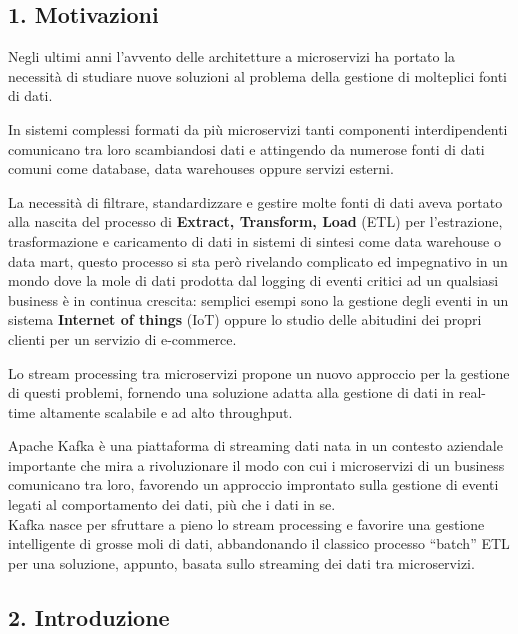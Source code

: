 \documentclass[]{article}
\begin{document}
\hypertarget{motivazioni}{\subsection{1.
Motivazioni}\label{motivazioni}}

Negli ultimi anni l'avvento delle architetture a microservizi ha portato
la necessità di studiare nuove soluzioni al problema della gestione di
molteplici fonti di dati.

In sistemi complessi formati da più microservizi tanti componenti
interdipendenti comunicano tra loro scambiandosi dati e attingendo da
numerose fonti di dati comuni come database, data warehouses oppure
servizi esterni.

La necessità di filtrare, standardizzare e gestire molte fonti di dati
aveva portato alla nascita del processo di \textbf{Extract, Transform,
Load} (ETL) per l'estrazione, trasformazione e caricamento di dati in
sistemi di sintesi come data warehouse o data mart, questo processo si
sta però rivelando complicato ed impegnativo in un mondo dove la mole di
dati prodotta dal logging di eventi critici ad un qualsiasi business è
in continua crescita: semplici esempi sono la gestione degli eventi in
un sistema \textbf{Internet of things} (IoT) oppure lo studio delle
abitudini dei propri clienti per un servizio di e-commerce.

Lo stream processing tra microservizi propone un nuovo approccio per la
gestione di questi problemi, fornendo una soluzione adatta alla gestione
di dati in real-time altamente scalabile e ad alto throughput.

Apache Kafka è una piattaforma di streaming dati nata in un contesto
aziendale importante che mira a rivoluzionare il modo con cui i
microservizi di un business comunicano tra loro, favorendo un approccio
improntato sulla gestione di eventi legati al comportamento dei dati,
più che i dati in se.\\
Kafka nasce per sfruttare a pieno lo stream processing e favorire una
gestione intelligente di grosse moli di dati, abbandonando il classico
processo ``batch'' ETL per una soluzione, appunto, basata sullo
streaming dei dati tra microservizi.

\newpage

\hypertarget{introduzione}{\subsection{2.
Introduzione}\label{introduzione}}
\end{document}

